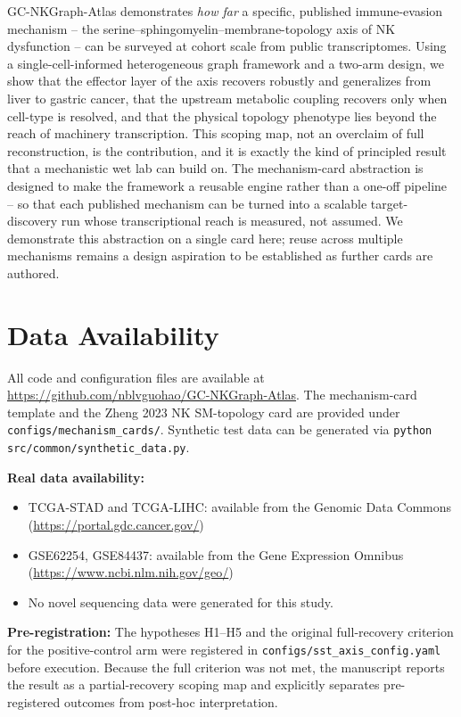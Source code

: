 \documentclass[modern,large,numbered,nocrop]{oup-authoring-template}
\begin{document}
GC-NKGraph-Atlas demonstrates \textit{how far} a specific, published immune-evasion mechanism -- the serine--sphingomyelin--membrane-topology axis of NK dysfunction -- can be surveyed at cohort scale from public transcriptomes. Using a single-cell-informed heterogeneous graph framework and a two-arm design, we show that the effector layer of the axis recovers robustly and generalizes from liver to gastric cancer, that the upstream metabolic coupling recovers only when cell-type is resolved, and that the physical topology phenotype lies beyond the reach of machinery transcription. This scoping map, not an overclaim of full reconstruction, is the contribution, and it is exactly the kind of principled result that a mechanistic wet lab can build on. The mechanism-card abstraction is designed to make the framework a reusable engine rather than a one-off pipeline -- so that each published mechanism can be turned into a scalable target-discovery run whose transcriptional reach is measured, not assumed. We demonstrate this abstraction on a single card here; reuse across multiple mechanisms remains a design aspiration to be established as further cards are authored.

\section*{Data Availability}

All code and configuration files are available at \url{https://github.com/nblvguohao/GC-NKGraph-Atlas}. The mechanism-card template and the Zheng 2023 NK SM-topology card are provided under \texttt{configs/mechanism\_cards/}. Synthetic test data can be generated via \texttt{python src/common/synthetic\_data.py}.

\textbf{Real data availability:}

\begin{itemize}
\item TCGA-STAD and TCGA-LIHC: available from the Genomic Data Commons (\url{https://portal.gdc.cancer.gov/})
\item GSE62254, GSE84437: available from the Gene Expression Omnibus (\url{https://www.ncbi.nlm.nih.gov/geo/})
\item No novel sequencing data were generated for this study.
\end{itemize}

\textbf{Pre-registration:} The hypotheses H1--H5 and the original full-recovery criterion for the positive-control arm were registered in \texttt{configs/sst\_axis\_config.yaml} before execution. Because the full criterion was not met, the manuscript reports the result as a partial-recovery scoping map and explicitly separates pre-registered outcomes from post-hoc interpretation.
\end{document}
